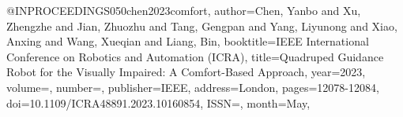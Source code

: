 @INPROCEEDINGS{050chen2023comfort,
author={Chen, Yanbo and Xu, Zhengzhe and Jian, Zhuozhu and Tang, Gengpan and Yang, Liyunong and Xiao, Anxing and Wang, Xueqian and Liang, Bin},
booktitle={IEEE International Conference on Robotics and Automation (ICRA)}, 
title={Quadruped Guidance Robot for the Visually Impaired: A Comfort-Based Approach}, 
year={2023},
volume={},
number={},
publisher={IEEE},
address={London},
pages={12078-12084},
doi={10.1109/ICRA48891.2023.10160854},
ISSN={},
month={May},}